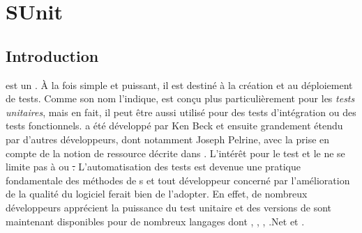 \documentclass[a4paper,10pt,twoside]{book}
\begin{document}
	\sloppy
\fi
\newcommand{\aconfirmer}[1]{#1}
\chapter{SUnit}

\section{Introduction}


 est un \framework. À la fois simple et
  puissant, il est destiné à la création et au déploiement de tests.
Comme son nom l'indique, \sunit est conçu plus particulièrement pour les \emph{tests unitaires},
mais en fait, il peut être aussi utilisé pour des tests d'intégration ou des tests fonctionnels. 
\sunit a été développé par Ken Beck et ensuite grandement étendu par d'autres développeurs, dont notamment Joseph Pelrine, avec la prise en compte de la notion de ressource décrite dans . 
L'intérêt pour le test et le  ne se limite pas à \pharo ou \st.
L'automatisation des tests est devenue une pratique fondamentale des méthodes de s et 
tout développeur concerné par l'amélioration de la qualité du logiciel ferait bien de l'adopter.  
En effet, de nombreux développeurs apprécient la puissance du test unitaire et des versions de \xUnit{} sont maintenant disponibles pour de nombreux langages dont , , , .Net et .
\end{document}
